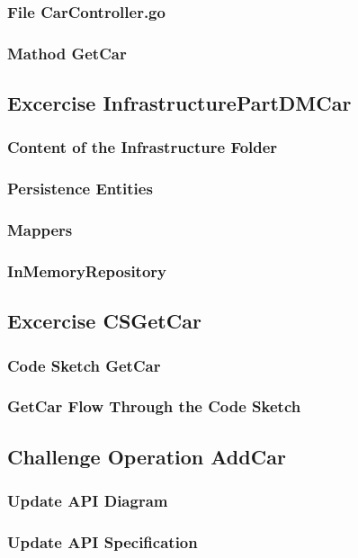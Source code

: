 \subsubsection*{File CarController.go}
\subsubsection*{Mathod GetCar}

\subsection{Excercise InfrastructurePartDMCar}
\subsubsection*{Content of the Infrastructure Folder}
\subsubsection*{Persistence Entities}
\subsubsection*{Mappers}
\subsubsection*{InMemoryRepository}


\subsection{Excercise CSGetCar}
\subsubsection*{Code Sketch GetCar}
\subsubsection*{GetCar Flow Through the Code Sketch}


\subsection{Challenge Operation AddCar}
\subsubsection*{Update API Diagram}
\subsubsection*{Update API Specification}
